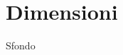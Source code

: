 \section{Dimensioni}

\begin{frame}[fragile]{Sfondo}\transfade\centering
  \begin{description}[<+->]
    \item[colore]
    \bigskip
  \end{description}
\end{frame}